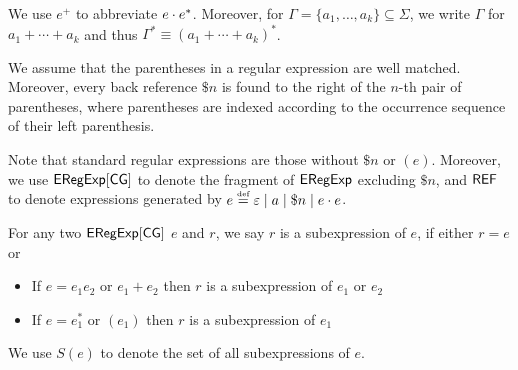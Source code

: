 We use $e^+$ to abbreviate $e \cdot e^*$. Moreover, for $\Gamma = \{a_1, \ldots, a_k\}\subseteq \Sigma$, we write $\Gamma$ for  $a_1 + \cdots + a_k$ and thus  $\Gamma^\ast \equiv (a_1 + \cdots + a_k)^\ast$. 

We assume that the parentheses in a regular expression are well matched. 
%
Moreover, every back reference $\$ n$ is found to the right of the $n$-th pair of parentheses, where parentheses
are indexed according to the occurrence sequence of their left parenthesis.
  
Note that standard regular expressions are those without $\$ n$ or $(e)$. Moreover, we use ${\sf ERegExp}[\sf CG]$ to denote the fragment of ${\sf ERegExp}$  excluding $\$ n$, and ${\sf REF}$ to denote expressions generated by $e \eqdef \varepsilon \mid a \mid \$n \mid e \concat e$.
  
  
  
  
  
  \begin{definition}[Subexpression]
  	For any two ${\sf ERegExp}[\sf CG]$ $e$ and $r$, we say $r$ is a subexpression of $e$,
  	if either $r=e$ or
  	\begin{itemize}
  		\item If $e = e_1 e_2$ or $e_1 + e_2$ then $r$ is a subexpression of $e_1$
  		or $e_2$
  		
  		\item If $e = e_1^{\ast}$ or $(e_1)$ then $r$ is a subexpression of $e_1$
  	\end{itemize}
  	We use $S (e)$ to denote the set of all subexpressions of $e$.
  \end{definition}
  
